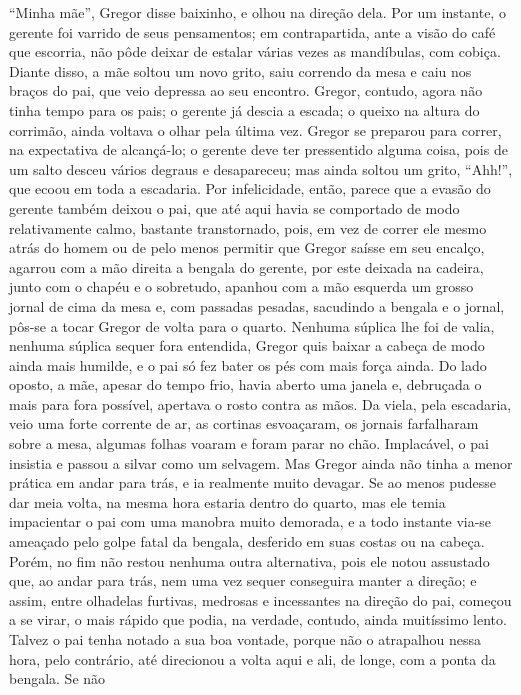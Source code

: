 “Minha mãe”, Gregor disse baixinho, e olhou na direção dela. Por um
instante, o gerente foi varrido de seus pensamentos; em contrapartida,
ante a visão do café que escorria, não pôde deixar de estalar várias vezes
as mandíbulas, com cobiça. Diante disso, a mãe soltou um novo grito, saiu
correndo da mesa e caiu nos braços do pai, que veio depressa ao seu
encontro. Gregor, contudo, agora não tinha tempo para os pais; o gerente
já descia a escada; o queixo na altura do corrimão, ainda voltava o olhar
pela última vez. Gregor se preparou para correr, na expectativa de alcançá-lo;
o gerente deve ter pressentido alguma coisa, pois de um salto desceu
vários degraus e desapareceu; mas ainda soltou um grito, “Ahh!”, que ecoou
em toda a escadaria. Por infelicidade, então, parece que a evasão do
gerente também deixou o pai, que até aqui havia se comportado de modo
relativamente calmo, bastante transtornado, pois, em vez de
correr ele mesmo atrás do homem ou de pelo menos permitir que Gregor saísse em seu
encalço, agarrou com a mão direita a bengala do gerente, por este deixada
na cadeira, junto com o chapéu e o sobretudo, apanhou com a mão esquerda
um grosso jornal de cima da mesa e, com passadas pesadas, sacudindo a
bengala e o jornal, pôs-se a tocar Gregor de volta para o quarto. Nenhuma
súplica lhe foi de valia, nenhuma súplica sequer fora entendida, Gregor
quis baixar a cabeça de modo ainda mais humilde, e o pai só fez bater os
pés com mais força ainda. Do lado oposto, a mãe, apesar do tempo frio,
havia aberto uma janela e, debruçada o mais para fora possível, apertava o
rosto contra as mãos. Da viela, pela escadaria, veio uma forte corrente de
ar, as cortinas esvoaçaram, os jornais farfalharam sobre a mesa, algumas
folhas voaram e foram parar no chão. Implacável, o pai insistia e passou a
silvar como um selvagem. Mas Gregor ainda não tinha a menor prática em
andar para trás, e ia realmente muito devagar. Se ao menos pudesse dar
meia volta, na mesma hora estaria dentro do quarto, mas ele temia
impacientar o pai com uma manobra muito demorada, e a todo instante via-se
ameaçado pelo golpe fatal da bengala, desferido em suas costas ou na
cabeça. Porém, no fim não restou nenhuma outra alternativa, pois ele notou
assustado que, ao andar para trás, nem uma vez sequer conseguira manter a
direção; e assim, entre olhadelas furtivas, medrosas e incessantes na
direção do pai, começou a se virar, o mais rápido que podia, na
verdade, contudo, ainda muitíssimo lento. Talvez o pai tenha notado a sua boa
vontade, porque não o atrapalhou nessa hora, pelo contrário, até
direcionou a volta aqui e ali, de longe, com a ponta da bengala. Se não
